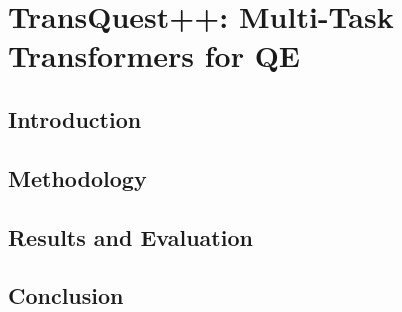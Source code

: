 \chapter{\label{cha:transquest_plus}TransQuest++: Multi-Task Transformers for QE}

\section{Introduction}
\cite{lee-2020-two} 
\section{Methodology}

\section{Results and Evaluation}

\section{Conclusion}